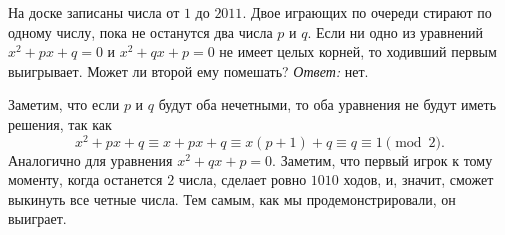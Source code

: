 \problem
На доске записаны числа от $1$ до $2011$.
Двое играющих по очереди стирают по одному числу, пока не останутся два числа
$p$ и $q$.
Если ни одно из уравнений $x^2 + p x + q = 0$ и $x^2 + q x + p = 0$ не имеет
целых корней, то ходивший первым выигрывает.
Может ли второй ему помешать?
\solution
\emph{Ответ:} нет.
\par
Заметим, что если $p$ и $q$ будут оба нечетными, то оба уравнения не будут
иметь решения, так как
\[
   x^2 + p x + q
\equiv
   x + p x + q
\equiv
   x (p + 1) + q
\equiv
   q
\equiv
   1
\pmod{2}
.\]
Аналогично для уравнения $x^2 + q x + p = 0$.
Заметим, что первый игрок к тому моменту, когда останется $2$ числа, сделает
ровно $1010$ ходов, и, значит, сможет выкинуть все четные числа.
Тем самым, как мы продемонстрировали, он выиграет.
\endproblem
